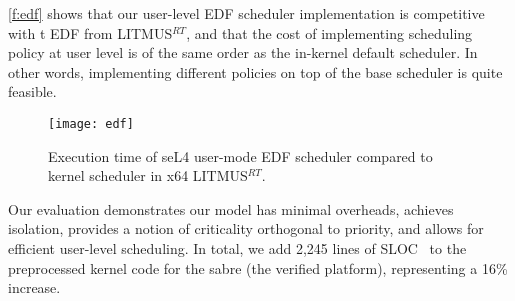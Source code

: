 \autoref{f:edf} shows that our user-level EDF scheduler implementation is
competitive with t EDF from LITMUS$^{RT}$, and
that the cost of implementing scheduling policy at user level is of
the same order as the in-kernel default scheduler. In other words,
implementing different policies on top of the base scheduler is quite feasible.

\begin{figure}[t]
    \centering
    \texttt{[image: edf]}
    \caption{Execution time of seL4 user-mode EDF scheduler compared to
             kernel scheduler in x64 LITMUS$^{RT}$.}
    \label{f:edf}
\end{figure}


Our evaluation demonstrates our model has minimal overheads, achieves isolation,  provides a notion
of criticality orthogonal to priority, and allows for efficient user-level scheduling.
In total, we add 2,245 lines of SLOC~\citep{Wheeler_01} to the preprocessed kernel code for the sabre
(the verified platform), representing a 16\% increase.

